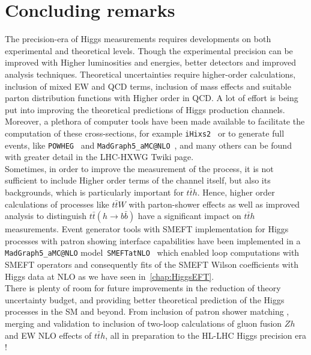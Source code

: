 \section{Concluding remarks \label{sec:singlehiggsconc}  }
The precision-era of Higgs measurements requires developments on both experimental and theoretical levels. Though the experimental precision can be improved with Higher luminosities and energies, better detectors and improved analysis techniques. Theoretical uncertainties require higher-order calculations, inclusion of mixed EW and QCD terms, inclusion of mass effects and suitable parton distribution functions with Higher order in QCD.  A lot of effort is being put into improving the theoretical predictions of Higgs production channels. Moreover, a plethora of computer tools have been made available to facilitate the computation of these cross-sections, for example  \texttt{iHixs2}~\cite{Dulat:2018rbf} or to generate full events, like \texttt{POWHEG}~\cite{Alioli:2008tz,Nason:2009ai,Bagnaschi:2011tu,Campbell:2012am,Luisoni:2013cuh,Jager:2014vna,Hartanto:2015uka} and \texttt{MadGraph5\_aMC@NLO}~\cite{Alwall:2014hca}, and many others can be found with greater detail in the LHC-HXWG Twiki page\cite{HXSWG}.  \\ Sometimes, in order to improve the measurement of the process, it is not sufficient to include Higher order terms  of the channel itself, but also its backgrounds, which is particularly important for $t\bar th $. Hence, higher order calculations of processes like $t\bar t W$ with parton-shower effects as well as improved analysis to distinguish $t\bar t(h \to b \bar b) $ have a significant impact on  $t\bar th $ measurements.
Event generator tools with SMEFT implementation for Higgs processes with patron showing interface capabilities  have been implemented in a \texttt{MadGraph5\_aMC@NLO} model~\texttt{SMEFTatNLO}~\cite{Degrande:2020evl} which enabled loop computations with SMEFT operators and consequently fits of the SMEFT Wilson coefficients with Higgs data at NLO as we have seen in~\autoref{chap:HiggsEFT}.\\
There is plenty of room for future improvements in the reduction of theory uncertainty budget, and providing better theoretical prediction of the Higgs processes in the SM and beyond. From inclusion of patron shower matching , merging and validation to  inclusion of two-loop calculations of gluon fusion $Zh$  and EW NLO effects of  $t\bar th $, all in preparation to the HL-LHC Higgs precision era ! 



